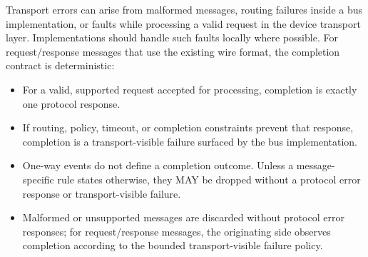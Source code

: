 Transport errors can arise from malformed messages, routing failures inside a
bus implementation, or faults while processing a valid request in the device
transport layer.
Implementations should handle such faults locally where possible. For
request/response messages that use the existing wire format, the completion
contract is deterministic:
\begin{itemize}
  \item For a valid, supported request accepted for processing, completion is
        exactly one protocol response.
  \item If routing, policy, timeout, or completion constraints prevent that
        response, completion is a transport-visible failure surfaced by the
        bus implementation.
  \item One-way events do not define a completion outcome. Unless a
        message-specific rule states otherwise, they MAY be dropped without a
        protocol error response or transport-visible failure.
  \item Malformed or unsupported messages are discarded without protocol error
        responses; for request/response messages, the originating side observes
        completion according to the bounded transport-visible failure policy.
\end{itemize}

